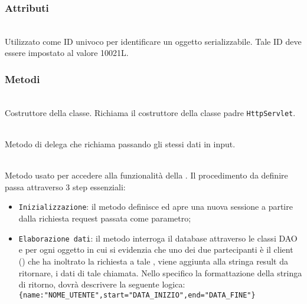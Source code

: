 \subsubsection*{Attributi}
\begin{description}
  \item{}\\
  Utilizzato come ID univoco per identificare un oggetto serializzabile. Tale ID deve essere impostato al valore 10021L.
\end{description}

\subsubsection*{Metodi}
\begin{description}
	\item{}\\
	Costruttore della classe. Richiama il costruttore della classe padre \texttt{HttpServlet}.
	
	\item{}\\
	Metodo di delega che richiama  passando gli stessi dati in input.
	
	\item{}\\
	Metodo usato per accedere alla funzionalità della . Il procedimento da definire passa attraverso 3 step essenziali:
	\begin{itemize}
		\item \texttt{Inizializzazione}: il metodo definisce ed apre una nuova sessione a partire dalla richiesta request passata come parametro;
		\item \texttt{Elaborazione dati}: il metodo interroga il database attraverso le classi DAO e per ogni oggetto  in cui si evidenzia che uno dei due partecipanti è il client () che ha inoltrato la richiesta a tale , viene aggiunta alla stringa result da ritornare, i dati di tale chiamata. Nello specifico la formattazione della stringa di ritorno, dovrà descrivere la seguente logica:\\
		
		\verb|{name:"NOME_UTENTE",start="DATA_INIZIO",end="DATA_FINE"}|\\
		

\end{itemize}
\end{description}
